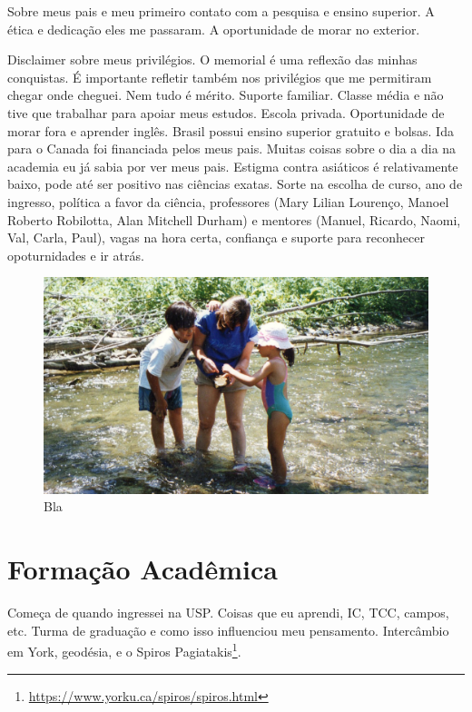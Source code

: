 \documentclass[11pt,a4paper,oneside]{book}
\begin{document}
Sobre meus pais e meu primeiro contato com a pesquisa e ensino superior.
A ética e dedicação eles me passaram.
A oportunidade de morar no exterior.

Disclaimer sobre meus privilégios.
O memorial é uma reflexão das minhas conquistas.
É importante refletir também nos privilégios que me permitiram chegar onde cheguei.
Nem tudo é mérito.
Suporte familiar.
Classe média e não tive que trabalhar para apoiar meus estudos.
Escola privada.
Oportunidade de morar fora e aprender inglês.
Brasil possui ensino superior gratuito e bolsas.
Ida para o Canada foi financiada pelos meus pais.
Muitas coisas sobre o dia a dia na academia eu já sabia por ver meus pais.
Estigma contra asiáticos é relativamente baixo, pode até ser positivo nas ciências exatas.
Sorte na escolha de curso, ano de ingresso, política a favor da ciência,
professores (Mary Lilian Lourenço, Manoel Roberto Robilotta, Alan Mitchell
Durham) e mentores (Manuel, Ricardo,
Naomi, Val, Carla, Paul), vagas na hora certa, confiança e suporte para reconhecer
opoturnidades e ir atrás.


\begin{figure}[h]
  \vspace{0.5cm}
  \begin{center}
    \includegraphics[width=\textwidth]{images/1997-06-ithaca-creek.jpg}
  \end{center}
  \caption{
    Bla
  }
\end{figure}

\chapter{Formação Acadêmica}

Começa de quando ingressei na USP.
Coisas que eu aprendi, IC, TCC, campos, etc.
Turma de graduação e como isso influenciou meu pensamento.
Intercâmbio em York, geodésia, e o
Spiros Pagiatakis\footnote{\url{https://www.yorku.ca/spiros/spiros.html}}.
\end{document}
